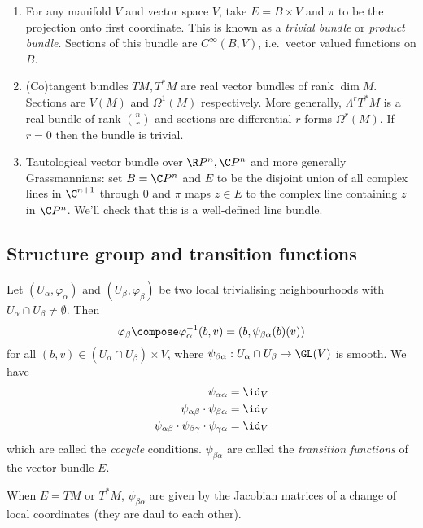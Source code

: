 \documentclass[a4paper]{article}
\begin{document}
\begin{eg}\leavevmode
  \begin{enumerate}
  \item For any manifold \(V\) and vector space \(V\), take \(E = B \times V\) and \(\pi\) to be the projection onto first coordinate. This is known as a \emph{trivial bundle} or \emph{product bundle}. Sections of this bundle are \(C^\infty(B, V)\), i.e.\ vector valued functions on \(B\).
  \item (Co)tangent bundles \(TM, T^*M\) are real vector bundles of rank \(\dim M\). Sections are \(V(M)\) and \(\Omega^1(M)\) respectively. More generally, \(\Lambda^rT^*M\) is a real bundle of rank \(\binom{n}{r}\) and sections are differential \(r\)-forms \(\Omega^r(M)\). If \(r = 0\) then the bundle is trivial.
  \item Tautological vector bundle over \(\R P^n, \C P^n\) and more generally Grassmannians: set \(B = \C P^n\) and \(E\) to be the disjoint union of all complex lines in \(\C^{n + 1}\) through \(0\) and \(\pi\) maps \(z \in E\) to the complex line containing \(z\) in \(\C P^n\). We'll check that this is a well-defined line bundle.
  \end{enumerate}
\end{eg}

\subsection{Structure group and transition functions}

Let \((U_\alpha, \varphi_\alpha)\) and \((U_\beta, \varphi_\beta)\) be two local trivialising neighbourhoods with \(U_\alpha \cap U_\beta \neq \emptyset\). Then
\[
  \varphi_\beta \compose \varphi_\alpha^{-1}(b, v) = (b, \psi_{\beta\alpha}(b)(v))
\]
for all \((b, v) \in (U_\alpha \cap U_\beta) \times V\), where \(\psi_{\beta\alpha}: U_\alpha \cap U_\beta \to \GL(V)\) is smooth. We have
\begin{align*}
  \psi_{\alpha\alpha} &= \id_V \\
  \psi_{\alpha\beta} \cdot \psi_{\beta\alpha} &= \id_V \\
  \psi_{\alpha\beta} \cdot \psi_{\beta\gamma} \cdot \psi_{\gamma\alpha} &= \id_V
\end{align*}
which are called the \emph{cocycle} conditions. \(\psi_{\beta\alpha}\) are called the \emph{transition functions} of the vector bundle \(E\).

\begin{eg}
  When \(E = TM\) or \(T^*M\), \(\psi_{\beta\alpha}\) are given by the Jacobian matrices of a change of local coordinates (they are daul to each other).
\end{eg}
\end{document}
